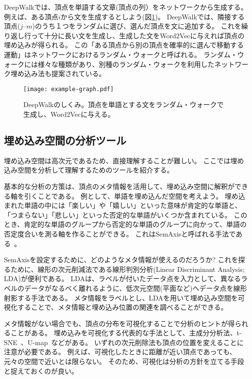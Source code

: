 \documentclass[12pt]{jarticle}
\begin{document}
DeepWalkでは、頂点を単語する文章(頂点の列）をネットワークから生成する。
例えば、ある頂点$i$から文を生成するとしよう(図\ref{fig:deepwalk})。
DeepWalkでは、隣接する頂点($j$--$m$)のうち１つをランダムに選び、選んだ頂点を文に追加する。
これを繰り返し行って十分に長い文を生成し、生成した文をWord2Vecに与えれば頂点の埋め込みが得られる。
この「ある頂点から別の頂点を確率的に選んで移動する運動」はネットワークにおけるランダム・ウォークと呼ばれる。
ランダム・ウォークには様々な種類があり、別種のランダム・ウォークを利用したネットワーク埋め込み法も提案されている\cite{Grover2016,Dong2017}。
\begin{figure}[h!]
    \centering
    \texttt{[image: example-graph.pdf]}
    \caption{
        DeepWalkのしくみ。頂点を単語とする文をランダム・ウォークで生成し、Word2Vecに与える。
    }
    \label{fig:deepwalk}
\end{figure}


\subsection{埋め込み空間の分析ツール}

埋め込み空間は高次元であるため、直接理解することが難しい。
ここでは埋め込み空間を分析して理解するためのツールを紹介する。

基本的な分析の方策は、頂点のメタ情報を活用して、埋め込み空間に解釈ができる軸を引くことである。
例として、単語を埋め込んだ空間を考えよう。
埋め込まれた単語の中には「楽しい」や「嬉しい」といった意味が肯定的な単語と、「つまらない」「悲しい」といった否定的な単語がいくつか含まれている。
このとき、肯定的な単語のグループから否定的な単語のグループに向かって、単語の否定度合いを測る軸を作ることができる。
これはSemAxisと呼ばれる手法である~\cite{An2018}。

SemAxisを設定するために、どのようなメタ情報が使えるのだろうか?
これを探るために、線形の次元削減法である線形判別分析(Linear Discriminant Analysis; LDA)が便利である。
LDAは、ラベルが付いたデータ点を入力として、異なるラベルのデータがなるべく離れるように、低次元空間(平面など)へデータ点を線形射影する手法である。
メタ情報をラベルとし、LDAを用いて埋め込み空間を可視化することで、メタ情報と埋め込み位置の関連を調べることができる。

メタ情報がない場合でも、頂点の分布を可視化することで分析のヒントが得られることがある。
埋め込みを可視化する代表的な手法として、主成分分析法、t-SNE~\cite{Maaten2008}、U-map~\cite{McInnes2018}などがある。
いずれの次元削除法も頂点の位置を変えることに注意が必要である。
例えば、可視化したときに距離が近い頂点であっても、元々の空間で近いとは限らない。
そのため、可視化は分析の方針を立てる手段と捉えておくのが良い。
\end{document}
